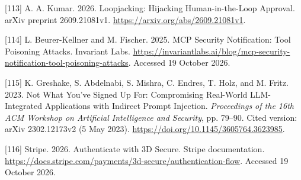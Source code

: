 \documentclass[
  11pt,
]{article}
\newlength{\cslhangindent}
\newlength{\cslentryspacingunit} %
\newenvironment{CSLReferences}[2] %
 {%
  \setlength{\parindent}{0pt}
  \ifodd #1
  \let\oldpar\par
  \def\par{\hangindent=\cslhangindent\oldpar}
  \fi
  \setlength{\parskip}{#2\cslentryspacingunit}
 }%
 {}
\begin{document}
\begin{CSLReferences}{1}{1}
\leavevmode{}%
{[}113{]} A. A. Kumar. 2026. Loopjacking: Hijacking Human-in-the-Loop
Approval. arXiv preprint 2609.21081v1.
\url{https://arxiv.org/abs/2609.21081v1}.

\leavevmode{}%
{[}114{]} L. Beurer-Kellner and M. Fischer. 2025. MCP Security
Notification: Tool Poisoning Attacks. Invariant Labs.
\url{https://invariantlabs.ai/blog/mcp-security-notification-tool-poisoning-attacks}.
Accessed 19 October 2026.

\leavevmode{}%
{[}115{]} K. Greshake, S. Abdelnabi, S. Mishra, C. Endres, T. Holz, and
M. Fritz. 2023. Not What You've Signed Up For: Compromising Real-World
LLM-Integrated Applications with Indirect Prompt Injection.
\emph{Proceedings of the 16th ACM Workshop on Artificial Intelligence
and Security}, pp. 79--90. Cited version: arXiv 2302.12173v2 (5 May
2023). \url{https://doi.org/10.1145/3605764.3623985}.

\leavevmode{}%
{[}116{]} Stripe. 2026. Authenticate with 3D Secure. Stripe
documentation.
\url{https://docs.stripe.com/payments/3d-secure/authentication-flow}.
Accessed 19 October 2026.

\end{CSLReferences}
\end{document}
